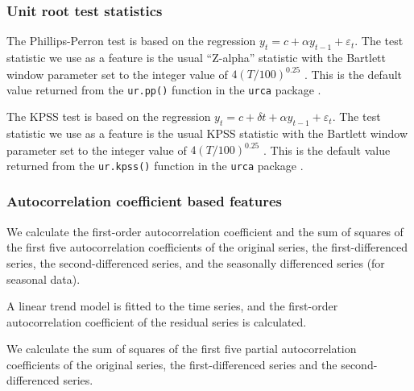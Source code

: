 \documentclass[11pt,a4paper,]{article}
\theoremstyle{definition}
\theoremstyle{definition}
\theoremstyle{definition}
\theoremstyle{remark}
\begin{document}
\hypertarget{unit-root-test-statistics}{%
\subsubsection*{Unit root test
statistics}\label{unit-root-test-statistics}}

The Phillips-Perron test is based on the regression
\(y_t= c + \alpha y_{t-1}+ \varepsilon_t\). The test statistic we use as
a feature is the usual ``Z-alpha'' statistic with the Bartlett window
parameter set to the integer value of \(4(T/100)^{0.25}\)
\autocite{Pfaff2008}. This is the default value returned from the
\texttt{ur.pp()} function in the \texttt{urca} package
\autocite{pfaff2016package}.

The KPSS test is based on the regression
\(y_t=c+\delta t+\alpha y_{t-1}+\varepsilon_t\). The test statistic we
use as a feature is the usual KPSS statistic with the Bartlett window
parameter set to the integer value of \(4(T/100)^{0.25}\)
\autocite{Pfaff2008}. This is the default value returned from the
\texttt{ur.kpss()} function in the \texttt{urca} package
\autocite{pfaff2016package}.

\hypertarget{autocorrelation-coefficient-based-features}{%
\subsubsection*{Autocorrelation coefficient based
features}\label{autocorrelation-coefficient-based-features}}

We calculate the first-order autocorrelation coefficient and the sum of
squares of the first five autocorrelation coefficients of the original
series, the first-differenced series, the second-differenced series, and
the seasonally differenced series (for seasonal data).

A linear trend model is fitted to the time series, and the first-order
autocorrelation coefficient of the residual series is calculated.

We calculate the sum of squares of the first five partial
autocorrelation coefficients of the original series, the
first-differenced series and the second-differenced series.

\printbibliography
\end{document}
